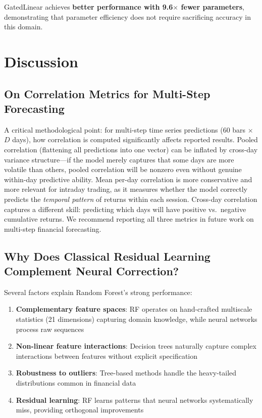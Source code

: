 \documentclass[10pt,conference]{IEEEtran}
\newcommand{\rev}[1]{#1}
\begin{document}
GatedLinear achieves \textbf{better performance with 9.6$\times$ fewer parameters}, demonstrating that parameter efficiency does not require sacrificing accuracy in this domain.

\section{Discussion}

\rev{
\subsection{On Correlation Metrics for Multi-Step Forecasting}

A critical methodological point: for multi-step time series predictions (60 bars $\times$ $D$ days), how correlation is computed significantly affects reported results. Pooled correlation (flattening all predictions into one vector) can be inflated by cross-day variance structure---if the model merely captures that some days are more volatile than others, pooled correlation will be nonzero even without genuine within-day predictive ability. Mean per-day correlation is more conservative and more relevant for intraday trading, as it measures whether the model correctly predicts the \textit{temporal pattern} of returns within each session. Cross-day correlation captures a different skill: predicting which days will have positive vs.\ negative cumulative returns. We recommend reporting all three metrics in future work on multi-step financial forecasting.
}

\subsection{Why Does Classical Residual Learning \rev{Complement Neural Correction}?}

Several factors explain Random Forest's strong performance:

\begin{enumerate}
    \item \textbf{Complementary feature spaces}: RF operates on hand-crafted multiscale statistics (21 dimensions) capturing domain knowledge, while neural networks process raw sequences
    \item \textbf{Non-linear feature interactions}: Decision trees naturally capture complex interactions between features without explicit specification
    \item \textbf{Robustness to outliers}: Tree-based methods handle the heavy-tailed distributions common in financial data
    \item \textbf{Residual learning}: RF learns patterns that neural networks systematically miss, providing orthogonal improvements
\end{enumerate}
\end{document}
